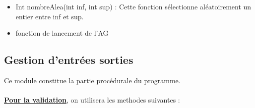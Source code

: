 \documentclass[a4paper,11pt]{article}
\begin{document}
\begin{itemize}
							\item Int nombreAlea(int inf, int sup) : Cette fonction sélectionne aléatoirement un entier entre inf et sup.

							\item fonction de lancement de l'AG
					\end{itemize}
		
		\subsection{Gestion d'entrées sorties}
			Ce module constitue la partie procédurale du programme.\\
			\\
			\underline{\bf Pour la validation}, on utilisera les methodes suivantes :\\
\end{document}
